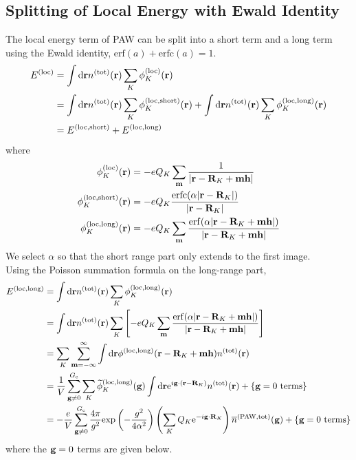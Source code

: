 \documentclass[paper=a4, fontsize=11pt]{article} %
\numberwithin{equation}{section} %
\numberwithin{figure}{section} %
\numberwithin{table}{section} %
\newcommand{\wt}{\widetilde}
\newcommand{\ol}{\overline}
\newcommand{\bh}{{\bf{h}}}
\newcommand{\bm}{{\bf{m}}}
\newcommand{\bg}{{\bf{g}}}
\newcommand{\br}{{\bf{r}}}
\newcommand{\bR}{{\bf{R}}}
\newcommand{\rexp}{{\mathrm{exp}}}
\newcommand{\re}{{\mathrm{e}}}
\newcommand{\rshort}{{\mathrm{short}}}
\newcommand{\rlong}{{\mathrm{long}}}
\newcommand{\rerf}{{\mathrm{erf}}}
\newcommand{\rerfc}{{\mathrm{erfc}}}
\newcommand{\rP}{{\mathrm{PAW}}}
\newcommand{\rd}{{\mathrm{d}}}
\newcommand{\rlo}{{\mathrm{loc}}}
\newcommand{\rtot}{{\mathrm{tot}}}
\newcommand{\ibgR}{i\bg\cdot\bR}
\newcommand{\Gc}{{G_{\mathrm{c}}}}
\begin{document}
\subsection{Splitting of Local Energy with Ewald Identity}
The local energy term of PAW can be split into a short term and a long term using the Ewald identity, $\mathrm{erf}(a)+\mathrm{erfc}(a)=1$.
\begin{equation}
\begin{split}
E^{(\rlo)}
&= \int \rd \br n^{(\rtot)}(\br) \sum_K\phi^{(\rlo)}_K(\br)\\
&=\int \rd \br n^{(\rtot)}(\br) \sum_K\phi_K^{(\rlo,\rshort)}(\br) +\int \rd \br n^{(\rtot)}(\br) \sum_K\phi_K^{(\rlo,\rlong)}(\br) \\
&=E^{(\rlo,\rshort)}+E^{(\rlo,\rlong)} \\
\end{split}
\end{equation}
where
\begin{equation}
\begin{split}
\phi_K^{(\rlo)}(\br)&=-eQ_K\sum_\bm \frac{1}{|\br-\bR_K+\bm\bh|}\\
\phi_K^{(\rlo,\rshort)}(\br)&=-eQ_K\frac{\rerfc(\alpha|\br-\bR_K|)}{|\br-\bR_K|} \\
\phi_K^{(\rlo,\rlong)}(\br)&=-eQ_K\sum_\bm \frac{\rerf(\alpha|\br-\bR_K+\bm \bh|)}{|\br-\bR_K+\bm\bh|}
\end{split}
\end{equation}
We select $\alpha$ so that the short range part only extends to the first image.\\

Using the Poisson summation formula on the long-range part,
\begin{equation}
\begin{split}
E^{(\rlo,\rlong)}
&= \int \rd \br n^{(\rtot)}(\br) \sum_K\phi_K^{(\rlo,\rlong)}(\br)\\
&= \int \rd \br n^{(\rtot)}(\br) \sum_K\left[-eQ_K\sum_\bm \frac{\rerf(\alpha|\br-\bR_K+\bm \bh|)}{|\br-\bR_K+\bm\bh|}\right]\\
&= \sum_{K}\sum_{{\bf m}=-\infty}^\infty \int \rd\br \phi^{(\rlo,\rlong)}(\br-\bR_{K}+\bm\bh) n^{(\rtot)}(\br)\\
&= \frac{1}{V} \sum_{\bg \neq 0}^\Gc \sum_{K} \wt \phi_K^{(\rlo,\rlong)} (\bg)\int \rd\br \re^{i\bg\cdot(\br-\bR_{K})}n^{(\rtot)}(\br)+\left\{\bg=0\ \mathrm{terms}\right\}\\
&= - \frac{e}{V} \sum_{\bg \neq 0}^{\Gc} \frac{4\pi}{g^2} \rexp\left(-\frac{g^2}{4\alpha^2}\right) \left(\sum_{K} Q_K \re^{-\ibgR_{K}}\right) \ol n^{(\rP,\rtot)}(\bg)+\left\{\bg=0\ \mathrm{terms}\right\}\\
\end{split}
\end{equation}
where the $\bg=0$ terms are given below.
\end{document}
